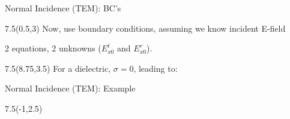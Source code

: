 \begin{lesson39}
\begin{frame}{Normal Incidence (TEM): BC's}
\begin{textblock}{7.5}(0.5,3) 
Now, use boundary conditions, assuming we know incident E-field
\vspace{-12pt}
\begin{small}
\end{small}
2 equations, 2 unknowns ($E_{x0}^t$ and $E_{x0}^r$). 
\vspace{-12pt}
\begin{small}
\end{small}
\end{textblock}

\begin{textblock}{7.5}(8.75,3.5)
For a dielectric, $\sigma = 0$, leading to: 
\begin{small}
\end{small}

\end{textblock}

\end{frame}




\begin{frame}{Normal Incidence (TEM): Example}
\begin{textblock}{7.5}(-1,2.5) 
\scalebox{0.99}{
	
}
\end{textblock}


\end{frame}
\end{lesson39}
